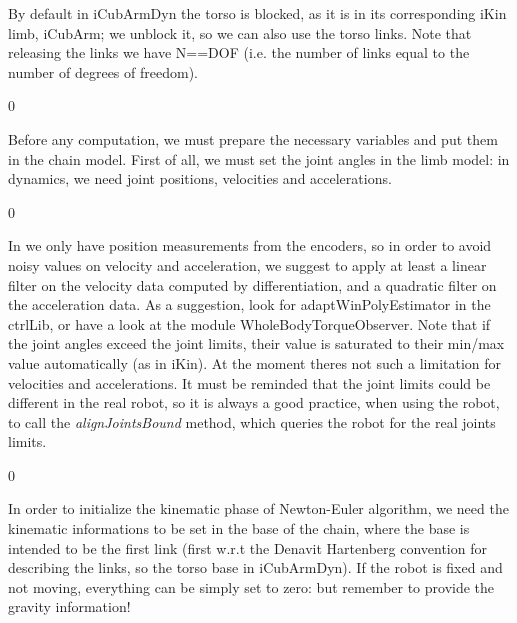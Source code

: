 By default in i\+Cub\+Arm\+Dyn the torso is blocked, as it is in its corresponding i\+Kin limb, i\+Cub\+Arm; we unblock it, so we can also use the torso links. Note that releasing the links we have N==DOF (i.\+e. the number of links equal to the number of degrees of freedom). 
\begin{DoxyCode}{0}

\end{DoxyCode}


Before any computation, we must prepare the necessary variables and put them in the chain model. First of all, we must set the joint angles in the limb model\+: in dynamics, we need joint positions, velocities and accelerations.


\begin{DoxyCode}{0}

\end{DoxyCode}


In  we only have position measurements from the encoders, so in order to avoid noisy values on velocity and acceleration, we suggest to apply at least a linear filter on the velocity data computed by differentiation, and a quadratic filter on the acceleration data. As a suggestion, look for adapt\+Win\+Poly\+Estimator in the ctrl\+Lib, or have a look at the module Whole\+Body\+Torque\+Observer. Note that if the joint angles exceed the joint limits, their value is saturated to their min/max value automatically (as in i\+Kin). At the moment there\textquotesingle{}s not such a limitation for velocities and accelerations. It must be reminded that the joint limits could be different in the real robot, so it is always a good practice, when using the robot, to call the {\itshape align\+Joints\+Bound} method, which queries the robot for the real joints limits.


\begin{DoxyCode}{0}

\end{DoxyCode}


In order to initialize the kinematic phase of Newton-\/\+Euler algorithm, we need the kinematic informations to be set in the base of the chain, where the base is intended to be the first link (first w.\+r.\+t the Denavit Hartenberg convention for describing the links, so the torso base in i\+Cub\+Arm\+Dyn). If the robot is fixed and not moving, everything can be simply set to zero\+: but remember to provide the gravity information!


